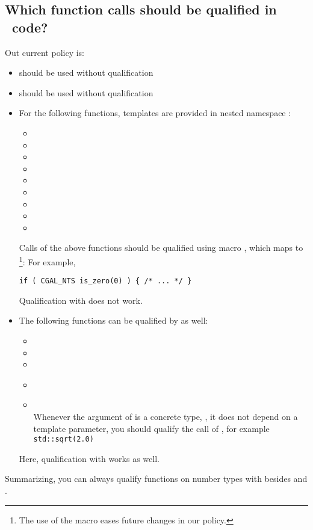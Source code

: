 \subsection{Which function calls should be qualified in \cgal\ code?}
Out current policy is:
\begin{itemize}
\item
{} should be used without qualification
\item
{} should be used without qualification
\item
For the following functions, templates are provided in nested namespace
:
\begin{itemize}
\item[]
\item[]
\item[]
\item[]
\item[]
\item[]
\item[]
\item[]
\item[]
\end{itemize}
Calls of the above functions should be qualified using macro 
,%
which maps to \footnote{The use of
the macro eases future changes in our policy.}: For example,
\begin{verbatim}
if ( CGAL_NTS is_zero(0) ) { /* ... */ } 
\end{verbatim}
Qualification with  does not work.
\item
The following functions can be qualified by  as well:
\begin{itemize} 
\item[]
\item[]
\item[]
\item[]\\
\item[]\\
Whenever the argument of  is a concrete type, \ie, it does
not depend on a template parameter, you should qualify the call of
, for example \verb+std::sqrt(2.0)+
\end{itemize}
Here, qualification with  works as well.
\end{itemize}
Summarizing, you can always qualify functions on number types
with  besides  and .


